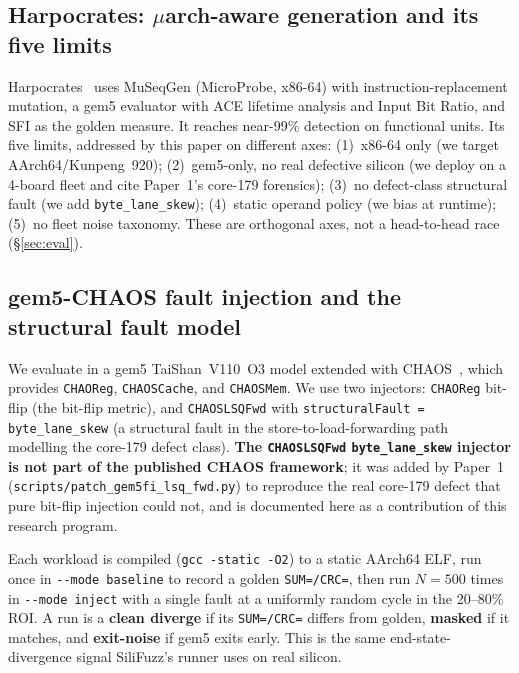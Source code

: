 \documentclass[sigplan,review,anonymous]{acmart}
\begin{document}
\subsection{Harpocrates: \(\mu\)arch-aware generation and its five limits}
Harpocrates~\cite{harpocrates_isca24,harpocrates_micro26} uses MuSeqGen (MicroProbe, x86-64) with instruction-replacement mutation, a gem5 evaluator with ACE lifetime analysis and Input Bit Ratio, and SFI as the golden measure. It reaches near-99\% detection on functional units. Its five limits, addressed by this paper on different axes: (1)~x86-64 only (we target AArch64/Kunpeng~920); (2)~gem5-only, no real defective silicon (we deploy on a 4-board fleet and cite Paper~1's core-179 forensics); (3)~no defect-class structural fault (we add \texttt{byte\_lane\_skew}); (4)~static operand policy (we bias at runtime); (5)~no fleet noise taxonomy. These are orthogonal axes, not a head-to-head race (\S\ref{sec:eval}).

\subsection{gem5-CHAOS fault injection and the structural fault model}
We evaluate in a gem5 TaiShan~V110~O3 model extended with CHAOS~\cite{chaos_gem5}, which provides \texttt{CHAOReg}, \texttt{CHAOSCache}, and \texttt{CHAOSMem}. We use two injectors: \texttt{CHAOReg} bit-flip (the bit-flip metric), and \texttt{CHAOSLSQFwd} with \texttt{structuralFault = byte\_lane\_skew} (a structural fault in the store-to-load-forwarding path modelling the core-179 defect class). \textbf{The \texttt{CHAOSLSQFwd} \texttt{byte\_lane\_skew} injector is not part of the published CHAOS framework}; it was added by Paper~1 (\texttt{scripts/patch\_gem5fi\_lsq\_fwd.py}) to reproduce the real core-179 defect that pure bit-flip injection could not, and is documented here as a contribution of this research program.

Each workload is compiled (\texttt{gcc -static -O2}) to a static AArch64 ELF, run once in \texttt{-{}-mode baseline} to record a golden \texttt{SUM=/CRC=}, then run $N{=}500$ times in \texttt{-{}-mode inject} with a single fault at a uniformly random cycle in the 20--80\% ROI. A run is a \textbf{clean diverge} if its \texttt{SUM=/CRC=} differs from golden, \textbf{masked} if it matches, and \textbf{exit-noise} if gem5 exits early. This is the same end-state-divergence signal SiliFuzz's runner uses on real silicon.
\end{document}
